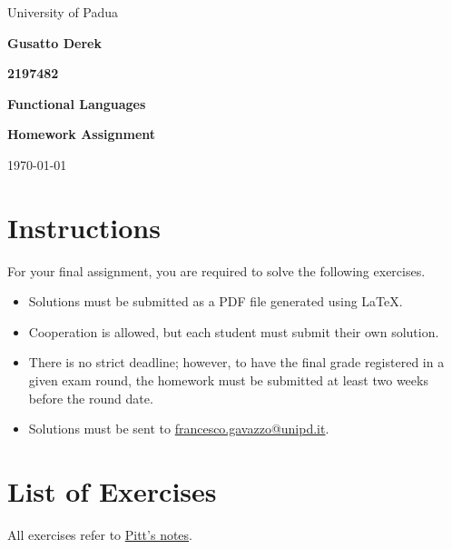 \documentclass[11pt,a4paper]{article}
\theoremstyle{definition}
\begin{document}
\begin{titlepage}
  \centering
  {\Large University of Padua \par}
  \vspace{1cm}
  \vspace{1cm}
   {\LARGE \textbf{Gusatto Derek} \par}
     {\LARGE \textbf{2197482} \par}
       \vspace{1cm}
  \vspace{1cm}
  {\LARGE \textbf{Functional Languages} \par} 
  {\Large \textbf{Homework Assignment} \par}

  \vfill
  {\large \today\par}
\end{titlepage}


\tableofcontents
\newpage
\section*{Instructions}

For your final assignment, you are required to solve the following exercises.

\begin{itemize}
  \item Solutions must be submitted as a PDF file generated using \LaTeX.
  \item Cooperation is allowed, but each student must submit their own solution.
  \item There is no strict deadline; however, to have the final grade registered
  in a given exam round, the homework must be submitted at least two weeks before
  the round date.
  \item Solutions must be sent to
  \href{mailto:francesco.gavazzo@unipd.it}{francesco.gavazzo@unipd.it}.
\end{itemize}

\section*{List of Exercises}

All exercises refer to \href{https://www.scss.tcd.ie/matthew.hennessy/splexternal2015/resources/Pitts.pdf}{Pitt's notes}.
\end{document}
